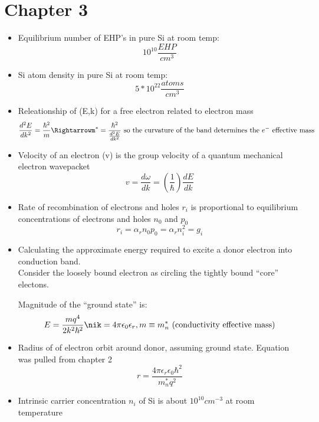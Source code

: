 \documentclass{article}
\begin{document}
\section{Chapter 3}
\begin{itemize}
\item Equilibrium number of EHP's in pure Si at room temp: $$10^{10}\frac{EHP}{cm^3}$$
\item Si atom density in pure Si at room temp: $$5*10^{22}\frac{atoms}{cm^3}$$
\item Releationship of (E,k) for a free electron related to electron mass
  \begin{equation}
    \frac{d^{2}E}{dk^2}=\frac{\hbar^2}{m}\Rightarrowm^*=\frac{\hbar^2}{\frac{d^2E}{dk^2}}\text{~so~the~curvature~of~the~band~determines~the~}e^{-}\text{~effective~mass}
  \end{equation}
\item Velocity of an electron (v) is the group velocity of a quantum mechanical electron wavepacket
  \begin{equation}v=\frac{d\omega}{dk} = (\frac{1}{\hbar})\frac{dE}{dk}\end{equation}
\item Rate of recombination of electrons and holes $r_i$ is proportional to equilibrium concentrations of electrons and holes $n_0$ and $p_0$
  \begin{equation}r_i=\alpha_rn_0p_0=\alpha_rn_i^2=g_i\end{equation}
\item Calculating the approximate energy required to excite a donor electron into conduction band.  \\
  
  Consider the loosely bound electron as circling the tightly bound ``core'' electons.

  Magnitude of the ``ground state'' is:
  \begin{equation}E=\frac{mq^4}{2k^2\hbar^2}\nik=4\pi\epsilon_0\epsilon_r, m\equiv m_n^*\text{~(conductivity~effective~mass)}\end{equation}
\item Radius of of electron orbit around donor, assuming ground state.  Equation was pulled from chapter 2
  \begin{equation}r=\frac{4\pi\epsilon_r\epsilon_0\hbar^2}{m_n^*q^2}\end{equation} 
\item Intrinsic carrier concentration $n_i$ of Si is about $10^{10}cm^{-3}$ at room temperature
\end{itemize}
\endsection
\end{document}
